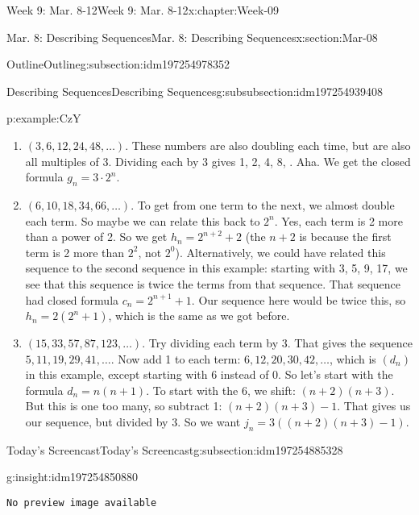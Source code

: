 \documentclass[oneside,10pt,]{book}
\newcommand{\mono}[1]{\texttt{#1}}
\numberwithin{equation}{section}
\newlength{\qrsize}
\newlength{\previewwidth}
\begin{document}
\begin{chapterptx}{Week 9: Mar. 8-12}{}{Week 9: Mar. 8-12}{}{}{x:chapter:Week-09}
\begin{sectionptx}{Mar. 8: Describing Sequences}{}{Mar. 8: Describing Sequences}{}{}{x:section:Mar-08}
\begin{subsectionptx}{Outline}{}{Outline}{}{}{g:subsection:idm197254978352}
\begin{subsubsectionptx}{Describing Sequences}{}{Describing Sequences}{}{}{g:subsubsection:idm197254939408}
\begin{example}{}{p:example:CzY}
\begin{enumerate}
\item{}\((3, 6, 12, 24, 48, \ldots )\). These numbers are also doubling each time, but are also all multiples of 3. Dividing each by 3 gives 1, 2, 4, 8, \textellipsis{}. Aha. We get the closed formula \(g_n = 3\cdot 2^{n}\).%
\item{}\((6, 10, 18, 34, 66, \ldots )\). To get from one term to the next, we almost double each term. So maybe we can relate this back to \(2^n\). Yes, each term is 2 more than a power of 2. So we get \(h_n = 2^{n+2} + 2\) (the \(n+2\) is because the first term is 2 more than \(2^2\), not \(2^0\)). Alternatively, we could have related this sequence to the second sequence in this example: starting with 3, 5, 9, 17, \textellipsis{} we see that this sequence is twice the terms from that sequence. That sequence had closed formula \(c_n = 2^{n+1} + 1\). Our sequence here would be twice this, so \(h_n = 2(2^n + 1)\), which is the same as we got before.%
\item{}\((15, 33, 57, 87, 123, \ldots)\). Try dividing each term by 3. That gives the sequence \(5, 11, 19, 29, 41,\ldots\). Now add 1 to each term: \(6, 12, 20, 30, 42, \ldots\), which is \((d_n)\) in this example, except starting with 6 instead of 0. So let's start with the formula \(d_n= n(n+1)\). To start with the 6, we shift: \((n+2)(n+3)\). But this is one too many, so subtract 1: \((n+2)(n+3) - 1\). That gives us our sequence, but divided by 3. So we want \(j_n = 3((n+2)(n+3) - 1)\).%
\end{enumerate}
%
\end{example}
\end{subsubsectionptx}
\end{subsectionptx}
%
%
\typeout{************************************************}
\typeout{************************************************}
%
\begin{subsectionptx}{Today's Screencast}{}{Today's Screencast}{}{}{g:subsection:idm197254885328}
\begin{insight}{}{g:insight:idm197254850880}%
\setlength{\qrsize}{9em}
\setlength{\previewwidth}{\linewidth}
\addtolength{\previewwidth}{-\qrsize}
\begin{tcbraster}[raster columns=2, raster column skip=1pt, raster halign=center, raster force size=false, raster left skip=0pt, raster right skip=0pt]%
\begin{tcolorbox}[previewstyle, width=\previewwidth]%
\mono{No preview image available}%
\end{tcolorbox}%

\end{tcbraster}
\end{insight}
\end{subsectionptx}
\end{sectionptx}
\end{chapterptx}
\end{document}
